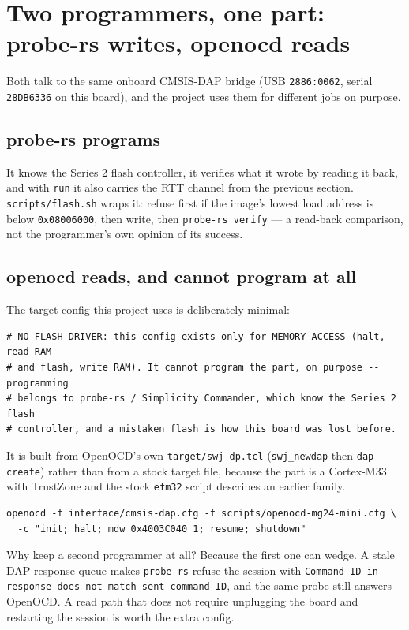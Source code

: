 \section{Two programmers, one part: probe-rs writes, openocd reads}
\label{sec:two-programmers-one-part}

Both talk to the same onboard CMSIS-DAP bridge (USB \texttt{2886:0062}, serial \texttt{28DB6336} on this board), and the
project uses them for different jobs on purpose.

\subsection{probe-rs programs}

It knows the Series 2 flash controller, it verifies what it wrote by reading it back, and with \texttt{run} it also
carries the RTT channel from the previous section. \texttt{scripts/flash.sh} wraps it: refuse first if the image's lowest
load address is below \texttt{0x08006000}, then write, then \texttt{probe-rs verify} --- a read-back comparison, not the
programmer's own opinion of its success.

\subsection{openocd reads, and cannot program at all}

The target config this project uses is deliberately minimal:

\begin{verbatim}
# NO FLASH DRIVER: this config exists only for MEMORY ACCESS (halt, read RAM
# and flash, write RAM). It cannot program the part, on purpose -- programming
# belongs to probe-rs / Simplicity Commander, which know the Series 2 flash
# controller, and a mistaken flash is how this board was lost before.
\end{verbatim}

It is built from OpenOCD's own \texttt{target/swj-dp.tcl} (\texttt{swj\_newdap} then \texttt{dap create}) rather than from
a stock target file, because the part is a Cortex-M33 with TrustZone and the stock \texttt{efm32} script describes an
earlier family.

\begin{verbatim}
openocd -f interface/cmsis-dap.cfg -f scripts/openocd-mg24-mini.cfg \
  -c "init; halt; mdw 0x4003C040 1; resume; shutdown"
\end{verbatim}

Why keep a second programmer at all? Because the first one can wedge. A stale DAP response queue makes \texttt{probe-rs}
refuse the session with \texttt{Command ID in response does not match sent command ID}, and the same probe still answers
OpenOCD. A read path that does not require unplugging the board and restarting the session is worth the extra config.

